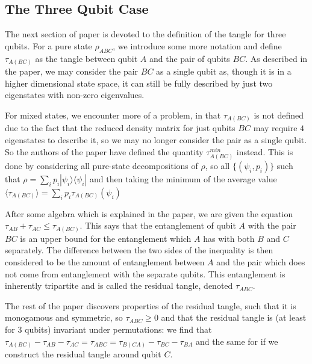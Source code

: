 \documentclass[12pt,a4paper]{article}
\numberwithin{equation}{section}
\begin{document}
\subsection{The Three Qubit Case}
\label{subsec:threeQubits}

The next section of paper \cite{CKW} is devoted to the definition of the tangle for three qubits. For a pure state $\rho_{ABC}$, we introduce some more notation and define $\tau_{A(BC)}$ as the tangle between qubit $A$ and the pair of qubits $BC$. As described in the paper, we may consider the pair $BC$ as a single qubit as, though it is in a higher dimensional state space, it can still be fully described by just two eigenstates with non-zero eigenvalues.

For mixed states, we encounter more of a problem, in that $\tau_{A(BC)}$ is not defined due to the fact that the reduced density matrix for just qubits $BC$ may require $4$ eigenstates to describe it, so we may no longer consider the pair as a single qubit. So the authors of the paper have defined the quantity $\tau_{A(BC)}^{min}$ instead. This is done by considering all pure-state decompositions of $\rho$, so all $\{(\psi_i,p_i)\}$ such that $\rho = \sum_{i}p_i|\psi_i\rangle\langle\psi_i|$ and then taking the minimum of the average value $\langle\tau_{A(BC)}\rangle = \sum_{i}p_i\tau_{A(BC)}(\psi_i)$

After some algebra which is explained in the paper, we are given the equation $\tau_{AB} + \tau_{AC} \leq \tau_{A(BC)}$. This says that the entanglement of qubit $A$ with the pair $BC$ is an upper bound for the entanglement which $A$ has with both $B$ and $C$ separately. The difference between the two sides of the inequality is then considered to be the amount of entanglement between $A$ and the pair which does not come from entanglement with the separate qubits. This entanglement is inherently tripartite and is called the residual tangle, denoted $\tau_{ABC}$.

The rest of the paper discovers properties of the residual tangle, such that it is monogamous and symmetric, so $\tau_{ABC} \geq 0$ and that the residual tangle is (at least for $3$ qubits) invariant under permutations: we find that $\tau_{A(BC)} - \tau_{AB} - \tau_{AC} = \tau_{ABC} = \tau_{B(CA)} - \tau_{BC} - \tau_{BA}$ and the same for if we construct the residual tangle around qubit $C$.

\newpage
\end{document}

